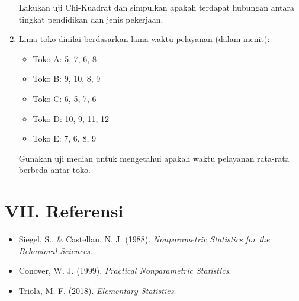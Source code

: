 \documentclass[12pt]{article}
\begin{document}
\begin{enumerate}
		Lakukan uji Chi-Kuadrat dan simpulkan apakah terdapat hubungan antara tingkat pendidikan dan jenis pekerjaan.
		
		\item Lima toko dinilai berdasarkan lama waktu pelayanan (dalam menit):
		
		\begin{itemize}
			\item Toko A: 5, 7, 6, 8
			\item Toko B: 9, 10, 8, 9
			\item Toko C: 6, 5, 7, 6
			\item Toko D: 10, 9, 11, 12
			\item Toko E: 7, 6, 8, 9
		\end{itemize}
		
		Gunakan uji median untuk mengetahui apakah waktu pelayanan rata-rata berbeda antar toko.
	\end{enumerate}
	
	
	\section*{VII. Referensi}
	\begin{itemize}
		\item Siegel, S., \& Castellan, N. J. (1988). \textit{Nonparametric Statistics for the Behavioral Sciences}.
		\item Conover, W. J. (1999). \textit{Practical Nonparametric Statistics}.
		\item Triola, M. F. (2018). \textit{Elementary Statistics}.
	\end{itemize}
	
\end{document}
